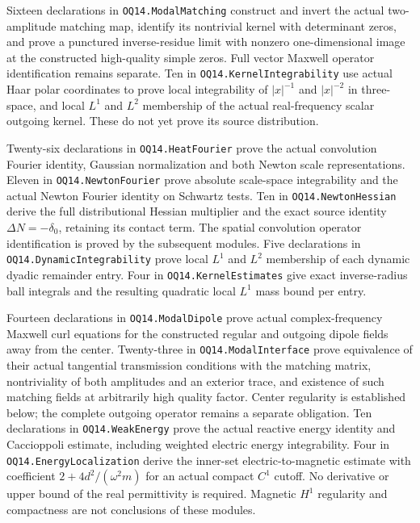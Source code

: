 Sixteen declarations in \texttt{OQ14.ModalMatching} construct and invert
the actual two-amplitude matching map, identify its nontrivial kernel
with determinant zeros, and prove a punctured inverse-residue limit with
nonzero one-dimensional image at the constructed high-quality simple
zeros. Full vector Maxwell operator identification remains separate.
Ten in \texttt{OQ14.KernelIntegrability} use actual Haar polar coordinates
to prove local integrability of $|x|^{-1}$ and $|x|^{-2}$ in three-space,
and local $L^1$ and $L^2$ membership of the actual real-frequency scalar
outgoing kernel. These do not yet prove its source distribution.

Twenty-six declarations in \texttt{OQ14.HeatFourier} prove the actual
convolution Fourier identity, Gaussian normalization and both Newton
scale representations. Eleven in \texttt{OQ14.NewtonFourier} prove
absolute scale-space integrability and the actual Newton Fourier identity
on Schwartz tests. Ten in \texttt{OQ14.NewtonHessian} derive the full
distributional Hessian multiplier and the exact source identity
$\Delta N=-\delta_0$, retaining its contact term. The spatial convolution
operator identification is proved by the subsequent modules.
Five declarations in \texttt{OQ14.DynamicIntegrability} prove local
$L^1$ and $L^2$ membership of each dynamic dyadic remainder entry.
Four in \texttt{OQ14.KernelEstimates} give exact inverse-radius ball
integrals and the resulting quadratic local $L^1$ mass bound per entry.

Fourteen declarations in \texttt{OQ14.ModalDipole} prove actual
complex-frequency Maxwell curl equations for the constructed regular and
outgoing dipole fields away from the center. Twenty-three in
\texttt{OQ14.ModalInterface} prove equivalence of their actual tangential
transmission conditions with the matching matrix, nontriviality of both
amplitudes and an exterior trace, and existence of such matching fields
at arbitrarily high quality factor. Center regularity is established below;
the complete outgoing operator remains a separate obligation.
Ten declarations in \texttt{OQ14.WeakEnergy} prove the actual reactive
energy identity and Caccioppoli estimate, including weighted electric
energy integrability. Four in \texttt{OQ14.EnergyLocalization} derive
the inner-set electric-to-magnetic estimate with coefficient
$2+4d^2/(\omega^2m)$ for an actual compact $C^1$ cutoff. No derivative
or upper bound of the real permittivity is required. Magnetic $H^1$
regularity and compactness are not conclusions of these modules.

